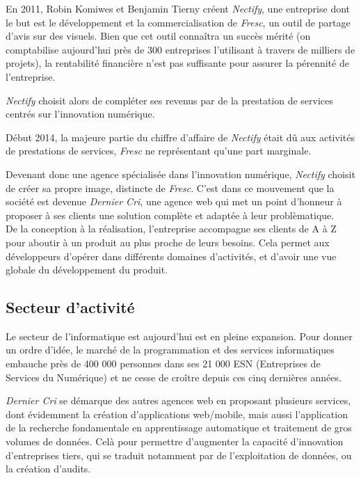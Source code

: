 \documentclass[12pt,a4paper]{article}
\begin{document}
  \bigskip

  En 2011, Robin Komiwes et Benjamin Tierny créent \emph{Nectify}, une
  entreprise dont le but est le développement et la commercialisation de
  \emph{Fresc}, un outil de partage d'avis sur des visuels. Bien que cet
  outil connaîtra un succès mérité (on comptabilise aujourd'hui près de
  300 entreprises l'utilisant à travers de milliers de projets), la
  rentabilité financière n'est pas suffisante pour assurer la pérennité de
  l'entreprise.

  \bigskip

  \emph{Nectify} choisit alors de compléter ses revenus par de la
  prestation de services centrés sur l'innovation numérique.

  \bigskip

  Début 2014, la majeure partie du chiffre d'affaire de \emph{Nectify}
  était dû aux activités de prestations de services, \emph{Fresc} ne
  représentant qu'une part marginale.

  \bigskip

  Devenant donc une agence spécialisée dans l'innovation numérique,
  \emph{Nectify} choisit de créer sa propre image, distincte de
  \emph{Fresc}. C'est dans ce mouvement que la société est devenue
  \emph{Dernier Cri}, une agence web qui met un point d'honneur à proposer
  à ses clients une solution complète et adaptée à leur problèmatique.\\
  De la conception à la réalisation, l'entreprise accompagne ses clients
  de A à Z pour aboutir à un produit au plus proche de leurs besoins. Cela
  permet aux développeurs d'opérer dans différents domaines d'activités,
  et d'avoir une vue globale du développement du produit.

  \bigskip

  \subsection{Secteur d'activité}\label{secteur-dactivituxe9}

  \bigskip

  Le secteur de l'informatique est aujourd'hui est en pleine expansion.
  Pour donner un ordre d'idée, le marché de la programmation et des
  services informatiques embauche près de 400 000 personnes dans ses 21
  000 ESN (Entreprises de Services du Numérique) et ne cesse de croître
  depuis ces cinq dernières années.

  \bigskip

  \emph{Dernier Cri} se démarque des autres agences web en proposant
  plusieurs services, dont évidemment la création d'applications
  web/mobile, mais aussi l'application de la recherche fondamentale en
  apprentissage automatique et traitement de gros volumes de données. Celà
  pour permettre d'augmenter la capacité d'innovation d'entreprises tiers,
  qui se traduit notamment par de l'exploitation de données, ou la
  création d'audits.
\end{document}
